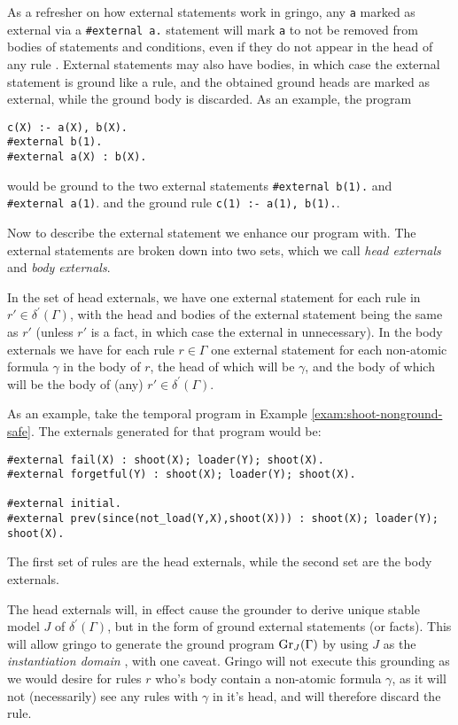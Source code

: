 As a refresher on how external statements work in gringo, any \verb|a|
marked as external via a \verb|#external a.| statement will mark
\verb|a| to not be removed from bodies of statements and conditions,
even if they do not appear in the head of any rule
\cite{PotasscoUserGuide19}. External statements may also have bodies,
in which case the external statement is ground like a rule, and the
obtained ground heads are marked as external, while the ground body is
discarded. As an example, the program
\begin{lstlisting}[language=clingo]
c(X) :- a(X), b(X).
#external b(1).
#external a(X) : b(X).
\end{lstlisting}
would be ground to the two external statements \verb|#external b(1).|
and \\\verb|#external a(1)|. and the ground rule
\verb|c(1) :- a(1), b(1).|.

Now to describe the external statement we enhance our program
with. The external statements are broken down into two sets, which we
call \emph{head externals} and \emph{body externals}.

In the set of head externals, we have one external statement for each
rule in $r' \in \delta^\prime(\Gamma)$, with the head and bodies of
the external statement being the same as $r'$ (unless $r'$ is a fact,
in which case the external in unnecessary). In the body externals we
have for each rule $r \in \Gamma$ one external statement for each
non-atomic formula $\gamma$ in the body of $r$, the head of which will
be $\gamma$, and the body of which will be the body of (any)
$r' \in \delta^\prime(\Gamma)$.


\begin{example}
  As an example, take the temporal program in Example
  \ref{exam:shoot-nonground-safe}. The externals generated for that program would be:
\begin{lstlisting}[numbers=none]
#external fail(X) : shoot(X); loader(Y); shoot(X).
#external forgetful(Y) : shoot(X); loader(Y); shoot(X).

#external initial.
#external prev(since(not_load(Y,X),shoot(X))) : shoot(X); loader(Y); shoot(X).
  \end{lstlisting}
  The first set of rules are the head externals, while the second set
  are the body externals.
\end{example}

The head externals will, in effect cause the grounder to derive unique
stable model $J$ of $\delta^\prime(\Gamma)$, but in the form of ground
external statements (or facts). This will allow gringo to generate the
ground program $\operatorname{Gr}_{J}(\Gamma)$ by using $J$ as the
\emph{instantiation domain} \cite[p. 82]{gekakasc12a}, with one
caveat. Gringo will not execute this grounding as we would desire for
rules $r$ who's body contain a non-atomic formula $\gamma$, as it will
not (necessarily) see any rules with $\gamma$ in it's head, and will
therefore discard the rule.

